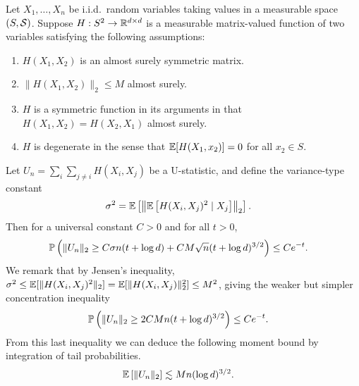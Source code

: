\begin{lemma}
  \label{lem:ustat_matrix_concentration}

  Let $X_1, \ldots, X_n$ be i.i.d.\ random variables
  taking values in a measurable space $(S, \cS)$.
  Suppose
  $H: S^2 \to \R^{d \times d}$
  is a measurable matrix-valued function
  of two variables
  satisfying the following assumptions:
  \begin{enumerate}[label=(\roman*)]

    \item
      $H(X_1, X_2)$ is an almost surely symmetric matrix.

    \item
      $\|H(X_1, X_2)\|_2 \leq M$ almost surely.

    \item
      $H$ is a symmetric function in its arguments in that
      $H(X_1, X_2) = H(X_2, X_1)$ almost surely.

    \item
      $H$ is degenerate in the sense that
      $\E[H(X_1, x_2)] = 0$ for all $x_2 \in S$.

  \end{enumerate}
  Let $U_n = \sum_i \sum_{j \neq i} H(X_i, X_j)$
  be a U-statistic,
  and define the variance-type constant
  \begin{align*}
    \sigma^2
    &=
    \E\left[
      \left\|
      \E\left[
        H(X_i, X_j)^2
        \mid X_j
      \right]
      \right\|_2
    \right].
  \end{align*}
  Then for a universal constant $C > 0$
  and for all $t > 0$,
  \begin{align*}
    \P\left(
      \|U_n\|_2
      \geq
      C \sigma n (t + \log d)
      + C M \sqrt{n} (t + \log d)^{3/2}
    \right)
    &\leq
    C e^{-t}.
  \end{align*}
  We remark that by Jensen's inequality,
  $\sigma^2 \leq \E[ \| H(X_i, X_j)^2 \|_2 ]
  = \E[ \| H(X_i, X_j) \|_2^2 ]
  \leq M^2$,
  giving the weaker but simpler concentration inequality
  \begin{align*}
    \P\left(
      \|U_n\|_2
      \geq
      2 C M n
      (t + \log d)^{3/2}
    \right)
    &\leq
    C e^{-t}.
  \end{align*}
  From this last inequality we can deduce the following moment bound
  by integration of tail probabilities.
  \begin{align*}
    \E\left[
      \|U_n\|_2
    \right]
    &\lesssim
    M n (\log d)^{3/2}.
  \end{align*}

\end{lemma}

